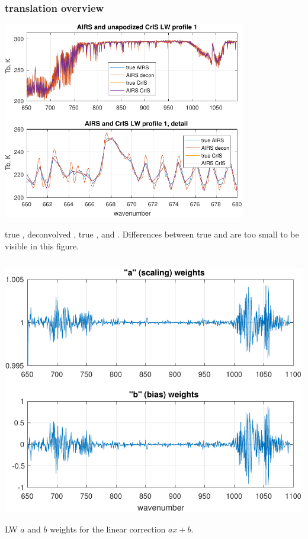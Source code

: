 \begin{frame}
\frametitle{translation overview}
  \begin{centering}
  \includegraphics[width=0.8\textwidth]{figures/a2cris_spec_LW.pdf}
  \end{centering}
  true {\airs}, deconvolved {\airs}, true {\cris}, and {\airs}
  {\cris}.  Differences between true {\cris} and {\airs} {\cris} are
  too small to be visible in this figure.
\end{frame}

\begin{column}{0.5\textwidth}  
  \begin{centering}
  \includegraphics[width=\textwidth]{figures/a2cris_coef_LW.pdf}
  \end{centering}\vspace{3mm}
  LW $a$ and $b$ weights for the linear correction $ax+b$.

\end{column}


